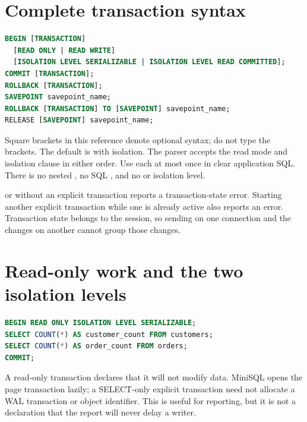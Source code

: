 \section{Complete transaction syntax}

\begin{lstlisting}[language=SQL]
BEGIN [TRANSACTION]
  [READ ONLY | READ WRITE]
  [ISOLATION LEVEL SERIALIZABLE | ISOLATION LEVEL READ COMMITTED];
COMMIT [TRANSACTION];
ROLLBACK [TRANSACTION];
SAVEPOINT savepoint_name;
ROLLBACK [TRANSACTION] TO [SAVEPOINT] savepoint_name;
RELEASE [SAVEPOINT] savepoint_name;
\end{lstlisting}

Square brackets in this reference denote optional syntax; do not type the
brackets. The default is  with 
isolation. The parser accepts the read mode and isolation clause in either
order. Use each at most once in clear application SQL. There is no nested
, no SQL , and no
 or  isolation level.

 or  without an explicit transaction reports a
transaction-state error. Starting another explicit transaction while one is
already active also reports an error. Transaction state belongs to the
session, so sending  on one connection and the changes on
another cannot group those changes.


\section{Read-only work and the two isolation levels}

\begin{lstlisting}[language=SQL]
BEGIN READ ONLY ISOLATION LEVEL SERIALIZABLE;
SELECT COUNT(*) AS customer_count FROM customers;
SELECT COUNT(*) AS order_count FROM orders;
COMMIT;
\end{lstlisting}

A read-only transaction declares that it will not modify data. MiniSQL opens
the page transaction lazily; a SELECT-only explicit transaction need not
allocate a WAL transaction or object identifier. This is useful for reporting,
but it is not a declaration that the report will never delay a writer.


